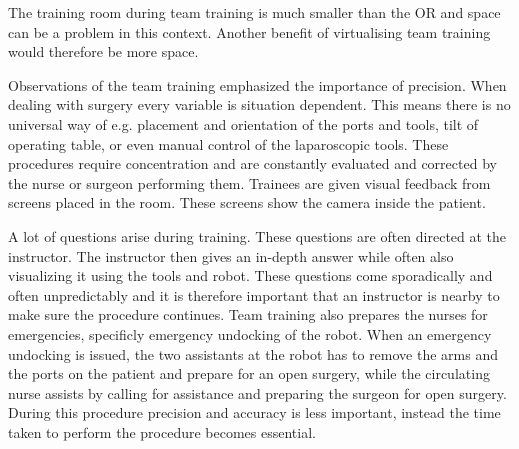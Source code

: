 \documentclass[conference]{IEEEtran}
\begin{document}
The training room during team training is much smaller than the OR and space can be a problem in this context. Another benefit of virtualising team training would therefore be more space.

Observations of the team training emphasized the importance of precision. When dealing with surgery every variable is situation dependent. This means there is no universal way of e.g. placement and orientation of the ports and tools, tilt of operating table, or even manual control of the laparoscopic tools. These procedures require concentration and are constantly evaluated and corrected by the nurse or surgeon performing them. Trainees are given visual feedback from screens placed in the room. These screens show the camera inside the patient. 


A lot of questions arise during training. These questions are often directed at the instructor. The instructor then gives an in-depth answer while often also visualizing it using the tools and robot. These questions come sporadically and often unpredictably and it is therefore important that an instructor is nearby to make sure the procedure continues. Team training also prepares the nurses for emergencies, specificly emergency undocking of the robot. When an emergency undocking is issued, the two assistants at the robot has to remove the arms and the ports on the patient and prepare for an open surgery, while the circulating nurse assists by calling for assistance and preparing the surgeon for open surgery. During this procedure precision and accuracy is less important, instead the time taken to perform the procedure becomes essential. 


%
\end{document}
